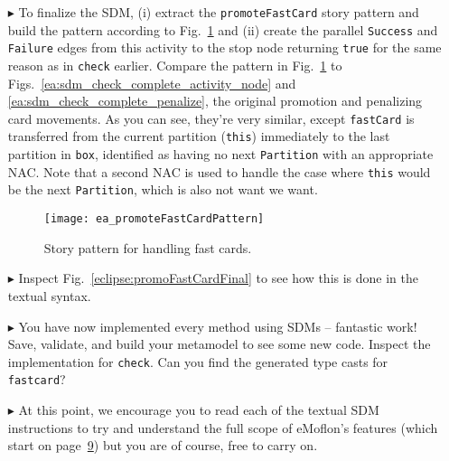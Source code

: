 \begin{itemize}
\item[$\blacktriangleright$] To finalize the SDM, (i) extract the \texttt{promoteFastCard} story pattern and build the pattern according to
Fig.~\ref{ea:promoteFastCardPattern} and (ii) create the parallel \texttt{Success} and \texttt{Failure} edges from this activity to the stop node returning 
\texttt{true} for the same reason as in \texttt{check} earlier. Compare the pattern in Fig.~\ref{ea:promoteFastCardPattern} to Figs.~\ref{ea:sdm_check_complete_activity_node} and \ref{ea:sdm_check_complete_penalize}, the
original promotion and penalizing card movements. As you can see, they're very similar, except \texttt{fastCard} is transferred from the current partition
(\texttt{this}) immediately to the last partition in \texttt{box}, identified as having no next \texttt{Partition} with an appropriate NAC.
Note that a second NAC is used to handle the case where \texttt{this} would be the next \texttt{Partition}, which is also not want we want.

\begin{figure}[htbp] 
\begin{center}
  \texttt{[image: ea\_promoteFastCardPattern]}
  \caption{Story pattern for handling fast cards.}  
  \label{ea:promoteFastCardPattern}
\end{center}
\end{figure}

\item[$\blacktriangleright$] Inspect Fig.~\ref{eclipse:promoFastCardFinal} to see how this is done in the textual syntax.

\item[$\blacktriangleright$] You have now implemented every method using SDMs -- fantastic work! Save, validate, and build your metamodel to see some new code.
Inspect the implementation for \texttt{check}.  Can you find the generated type casts for \texttt{fastcard}?

\item[$\blacktriangleright$] At this point, we encourage you to read each of the textual SDM instructions to try and understand the full scope of eMoflon's
features (which start on page~\hyperlink{page.9}{9}) but you are of course, free to carry on.


\end{itemize}
